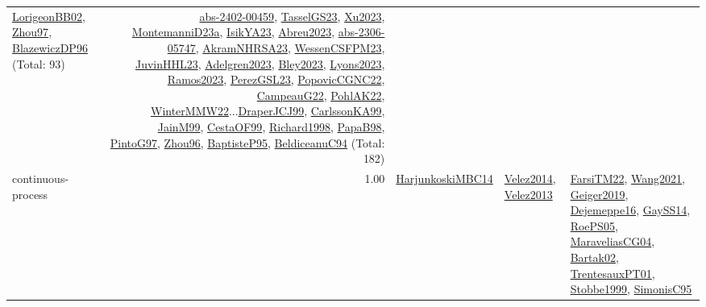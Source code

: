 {\begin{longtable}{p{3cm}r>{\raggedright\arraybackslash}p{6cm}>{\raggedright\arraybackslash}p{6cm}>{\raggedright\arraybackslash}p{8cm}}
\hyperref[detail:LorigeonBB02]{LorigeonBB02}, \hyperref[detail:Zhou97]{Zhou97}, \hyperref[detail:BlazewiczDP96]{BlazewiczDP96} (Total: 93) & \hyperref[detail:abs-2402-00459]{abs-2402-00459}, \hyperref[detail:TasselGS23]{TasselGS23}, \hyperref[detail:Xu2023]{Xu2023}, \hyperref[detail:MontemanniD23a]{MontemanniD23a}, \hyperref[detail:IsikYA23]{IsikYA23}, \hyperref[detail:Abreu2023]{Abreu2023}, \hyperref[detail:abs-2306-05747]{abs-2306-05747}, \hyperref[detail:AkramNHRSA23]{AkramNHRSA23}, \hyperref[detail:WessenCSFPM23]{WessenCSFPM23}, \hyperref[detail:JuvinHHL23]{JuvinHHL23}, \hyperref[detail:Adelgren2023]{Adelgren2023}, \hyperref[detail:Bley2023]{Bley2023}, \hyperref[detail:Lyons2023]{Lyons2023}, \hyperref[detail:Ramos2023]{Ramos2023}, \hyperref[detail:PerezGSL23]{PerezGSL23}, \hyperref[detail:PopovicCGNC22]{PopovicCGNC22}, \hyperref[detail:CampeauG22]{CampeauG22}, \hyperref[detail:PohlAK22]{PohlAK22}, \hyperref[detail:WinterMMW22]{WinterMMW22}...\hyperref[detail:DraperJCJ99]{DraperJCJ99}, \hyperref[detail:CarlssonKA99]{CarlssonKA99}, \hyperref[detail:JainM99]{JainM99}, \hyperref[detail:CestaOF99]{CestaOF99}, \hyperref[detail:Richard1998]{Richard1998}, \hyperref[detail:PapaB98]{PapaB98}, \hyperref[detail:PintoG97]{PintoG97}, \hyperref[detail:Zhou96]{Zhou96}, \hyperref[detail:BaptisteP95]{BaptisteP95}, \hyperref[detail:BeldiceanuC94]{BeldiceanuC94} (Total: 182)\\
\index{continuous-process}\index{Concepts!continuous-process}continuous-process &  1.00 & \hyperref[detail:HarjunkoskiMBC14]{HarjunkoskiMBC14} & \hyperref[detail:Velez2014]{Velez2014}, \hyperref[detail:Velez2013]{Velez2013} & \hyperref[detail:FarsiTM22]{FarsiTM22}, \hyperref[detail:Wang2021]{Wang2021}, \hyperref[detail:Geiger2019]{Geiger2019}, \hyperref[detail:Dejemeppe16]{Dejemeppe16}, \hyperref[detail:GaySS14]{GaySS14}, \hyperref[detail:RoePS05]{RoePS05}, \hyperref[detail:MaraveliasCG04]{MaraveliasCG04}, \hyperref[detail:Bartak02]{Bartak02}, \hyperref[detail:TrentesauxPT01]{TrentesauxPT01}, \hyperref[detail:Stobbe1999]{Stobbe1999}, \hyperref[detail:SimonisC95]{SimonisC95}\\

\end{longtable}}
